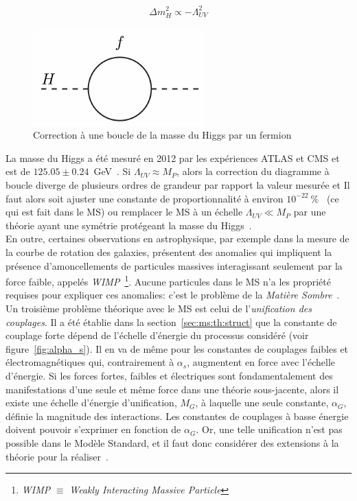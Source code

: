 \begin{eqnarray}
\label{eq:higgs_fermion_corr}
\Delta m_H^2 \propto -\Lambda_{UV}^2
\end{eqnarray}

\begin{figure}
  \centering
  \includegraphics{higgs-loop.pdf}
  \caption{Correction à une boucle de la masse du Higgs par un fermion}
  \label{fig:hloop}
\end{figure}

La masse du Higgs a été mesuré en 2012 par les expériences ATLAS et
CMS et est de
$125.05 \pm 0.24$~GeV~\cite{atlas_collaboration_combined_2015}. Si
$\Lambda_{UV} \approx M_P$, alors la correction du diagramme à boucle
diverge de plusieurs ordres de grandeur par rapport la valeur mesurée
et Il faut alors soit ajuster une constante de proportionnalité à
environ $10^{-22}~\%$~\cite{giudice_naturally_20087} (ce qui est fait
dans le MS) ou remplacer le MS à un échelle $\Lambda_{UV} \ll M_P$ par
une théorie ayant une symétrie protégeant la masse du
Higgs~\cite{martin_supersymmetry_1997}. \\

En outre, certaines observations en astrophysique, par exemple dans la
mesure de la courbe de rotation des galaxies, présentent des anomalies
qui impliquent la présence d'amoncellements de particules massives
interagissant seulement par la force faible, appelés
\emph{WIMP}~\footnote{\emph{WIMP} $\equiv$ \emph{Weakly Interacting
    Massive Particle}}. Aucune particules dans le MS n'a les propriété
requises pour expliquer ces anomalies: c'est le problème de la
\emph{Matière Sombre}~\cite{bertone_particle_2005}. \\

Un troisième problème théorique avec le MS est celui de
l'\emph{unification des couplages}. Il a été établie dans la
section~\ref{sec:ms:th:struct} que la constante de couplage forte
dépend de l'échelle d'énergie du processus considéré (voir
figure~\ref{fig:alpha_s}). Il en va de même pour les constantes de
couplages faibles et électromagnétiques qui, contrairement à
$\alpha_s$, augmentent en force avec l'échelle d'énergie. Si les
forces fortes, faibles et électriques sont fondamentalement des
manifestations d'une seule et même force dans une théorie
sous-jacente, alors il existe une échelle d'énergie d'unification,
$M_G$, à laquelle une seule constante, $\alpha_G$, définie la magnitude
des interactions. Les constantes de couplages à basse énergie doivent pouvoir
s'exprimer en fonction de $\alpha_G$. Or, une telle unification n'est
pas possible dans le Modèle Standard, et il faut donc considérer des
extensions à la théorie pour la réaliser~\cite{olive_gut_2014,thomson_modern_2013}.


